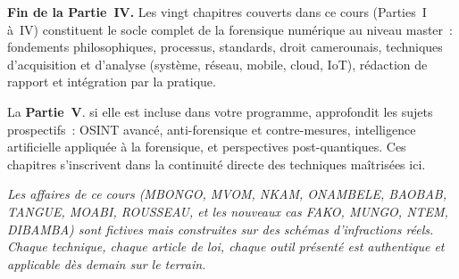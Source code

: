 \bigskip

\begin{boxinfo}
\textbf{Fin de la Partie~IV.} Les vingt chapitres couverts dans
ce cours (Parties~I à~IV) constituent le socle complet de la
forensique numérique au niveau master~: fondements philosophiques,
processus, standards, droit camerounais, techniques d'acquisition
et d'analyse (système, réseau, mobile, cloud, IoT), rédaction
de rapport et intégration par la pratique.

La \textbf{Partie~V}. si elle est incluse dans votre programme, approfondit les sujets prospectifs~: OSINT avancé,
anti-forensique et contre-mesures, intelligence artificielle
appliquée à la forensique, et perspectives post-quantiques.
Ces chapitres s'inscrivent dans la continuité directe des
techniques maîtrisées ici.

\textit{Les affaires de ce cours (MBONGO, MVOM, NKAM,
ONAMBELE, BAOBAB, TANGUE, MOABI, ROUSSEAU, et les nouveaux
cas FAKO, MUNGO, NTEM, DIBAMBA) sont fictives mais
construites sur des schémas d'infractions réels. Chaque
technique, chaque article de loi, chaque outil présenté est
authentique et applicable dès demain sur le terrain.}
\end{boxinfo}
